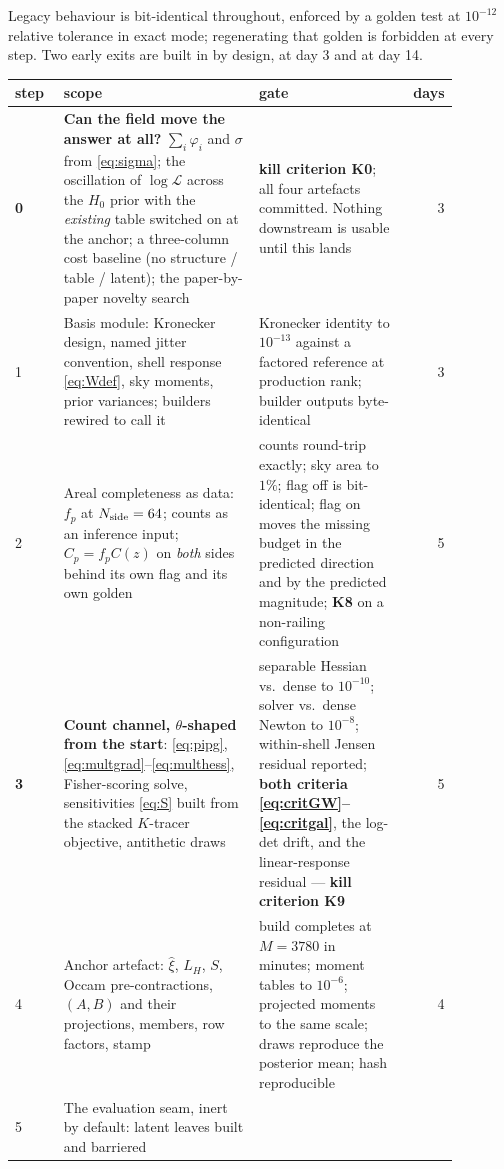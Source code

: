 \documentclass[11pt]{article}
\theoremstyle{definition}
\theoremstyle{remark}
\begin{document}
Legacy behaviour is bit-identical throughout, enforced by a golden test at
$10^{-12}$ relative tolerance in exact mode; regenerating that golden is
forbidden at every step. Two early exits are built in by design, at day 3 and at
day 14.

\begin{longtable}{@{}p{0.11\linewidth}p{0.44\linewidth}p{0.33\linewidth}r@{}}
\toprule
step & scope & gate & days\\
\midrule
\endhead
\textbf{0} & \textbf{Can the field move the answer at all?} $\sum_i\varphi_i$ and
$\sigma$ from \eqref{eq:sigma}; the oscillation of $\log\mathcal L$ across the $H_0$
prior with the \emph{existing} table switched on at the anchor; a three-column cost
baseline (no structure / table / latent); the paper-by-paper novelty search &
\textbf{kill criterion K0}; all four artefacts committed. Nothing downstream is
usable until this lands & 3\\
1 & Basis module: Kronecker design, named jitter convention, shell response
\eqref{eq:Wdef}, sky moments, prior variances; builders rewired to call it &
Kronecker identity to $10^{-13}$ against a factored reference at production rank;
builder outputs byte-identical & 3\\
2 & Areal completeness as data: $f_p$ at $N_{\rm side}=64$; counts as an inference
input; $C_p=f_pC(z)$ on \emph{both} sides behind its own flag and its own golden &
counts round-trip exactly; sky area to $1\%$; flag off is bit-identical; flag on
moves the missing budget in the predicted direction and by the predicted magnitude;
\textbf{K8} on a non-railing configuration & 5\\
\textbf{3} & \textbf{Count channel, $\theta$-shaped from the start}: \eqref{eq:pipg},
\eqref{eq:multgrad}--\eqref{eq:multhess}, Fisher-scoring solve, sensitivities
\eqref{eq:S} built from the stacked $K$-tracer objective, antithetic draws &
separable Hessian vs.\ dense to $10^{-10}$; solver vs.\ dense Newton to $10^{-8}$;
within-shell Jensen residual reported; \textbf{both criteria
\eqref{eq:critGW}--\eqref{eq:critgal}}, the log-det drift, and the linear-response
residual --- \textbf{kill criterion K9} & 5\\
4 & Anchor artefact: $\hat\xi$, $L_H$, $S$, Occam pre-contractions, $(A,B)$ and
their projections, members, row factors, stamp &
build completes at $M=3780$ in minutes; moment tables to $10^{-6}$; projected
moments to the same scale; draws reproduce the posterior mean; hash reproducible &
4\\
5 & The evaluation seam, inert by default: latent leaves built and barriered

\end{longtable}
\end{document}
